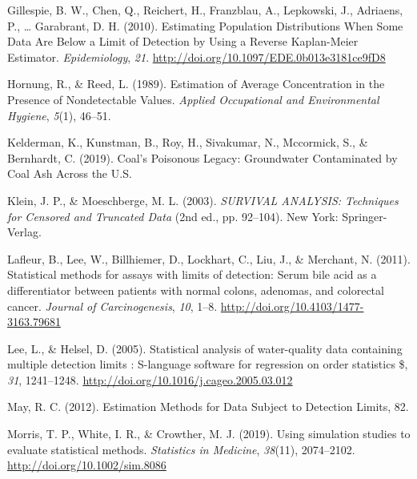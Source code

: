 \documentclass[12pt, twoside]{amherstthesis}
\newlength{\cslhangindent}
\newenvironment{cslreferences}%
  {\setlength{\parindent}{0pt}%
  \everypar{\setlength{\hangindent}{\cslhangindent}}\ignorespaces}%
  {\par}
\begin{document}
\begin{cslreferences}
\leavevmode\hypertarget{ref-Gillespie2010}{}%
Gillespie, B. W., Chen, Q., Reichert, H., Franzblau, A., Lepkowski, J., Adriaens, P., \ldots{} Garabrant, D. H. (2010). Estimating Population Distributions When Some Data Are Below a Limit of Detection by Using a Reverse Kaplan-Meier Estimator. \emph{Epidemiology}, \emph{21}. \url{http://doi.org/10.1097/EDE.0b013e3181ce9fD8}

\leavevmode\hypertarget{ref-Hornung1989}{}%
Hornung, R., \& Reed, L. (1989). Estimation of Average Concentration in the Presence of Nondetectable Values. \emph{Applied Occupational and Environmental Hygiene}, \emph{5}(1), 46--51.

\leavevmode\hypertarget{ref-Kelderman2019}{}%
Kelderman, K., Kunstman, B., Roy, H., Sivakumar, N., Mccormick, S., \& Bernhardt, C. (2019). Coal's Poisonous Legacy: Groundwater Contaminated by Coal Ash Across the U.S.

\leavevmode\hypertarget{ref-Klein2003}{}%
Klein, J. P., \& Moeschberge, M. L. (2003). \emph{SURVIVAL ANALYSIS: Techniques for Censored and Truncated Data} (2nd ed., pp. 92--104). New York: Springer-Verlag.

\leavevmode\hypertarget{ref-Lafleur2011}{}%
Lafleur, B., Lee, W., Billhiemer, D., Lockhart, C., Liu, J., \& Merchant, N. (2011). Statistical methods for assays with limits of detection: Serum bile acid as a differentiator between patients with normal colons, adenomas, and colorectal cancer. \emph{Journal of Carcinogenesis}, \emph{10}, 1--8. \url{http://doi.org/10.4103/1477-3163.79681}

\leavevmode\hypertarget{ref-Lee2005}{}%
Lee, L., \& Helsel, D. (2005). Statistical analysis of water-quality data containing multiple detection limits : S-language software for regression on order statistics \$, \emph{31}, 1241--1248. \url{http://doi.org/10.1016/j.cageo.2005.03.012}

\leavevmode\hypertarget{ref-May2012}{}%
May, R. C. (2012). Estimation Methods for Data Subject to Detection Limits, 82.

\leavevmode\hypertarget{ref-Morris2019}{}%
Morris, T. P., White, I. R., \& Crowther, M. J. (2019). Using simulation studies to evaluate statistical methods. \emph{Statistics in Medicine}, \emph{38}(11), 2074--2102. \url{http://doi.org/10.1002/sim.8086}
\end{cslreferences}
\end{document}
